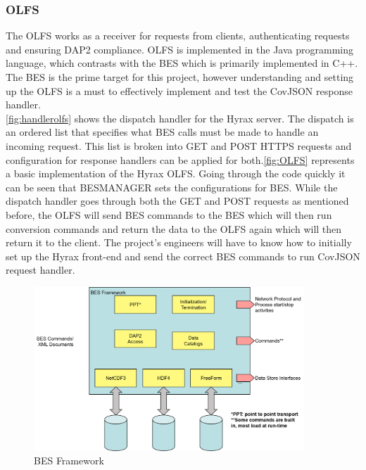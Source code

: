 \documentclass[onecolumn, draftclsnofoot,10pt, compsoc]{IEEEtran}
\begin{document}
\subsubsection{OLFS}
The OLFS works as a receiver for requests from clients, authenticating requests and ensuring DAP2 compliance. OLFS is implemented in the Java programming language, which contrasts with the BES which is primarily implemented in C++. The BES is the prime target for this project, however understanding and setting up the OLFS is a must to effectively implement and test the CovJSON response handler. \\
\autoref{fig:handlerolfs} shows the dispatch handler for the Hyrax server. The dispatch is an ordered list that specifies what BES calls must be made to handle an incoming request. This list is broken into \gls{GET} and \gls{POST} HTTPS requests and configuration for response handlers can be applied for both.\autoref{fig:OLFS} represents a basic implementation of the Hyrax OLFS.
Going through the code quickly it can be seen that BESMANAGER sets the configurations for BES. While the dispatch handler goes through both the GET and POST requests as mentioned before, the OLFS will send BES commands to the BES which will then run conversion commands and return the data to the OLFS again which will then return it to the client. The project's engineers will have to know how to initially set up the Hyrax front-end and send the correct BES commands to run CovJSON request handler. \cite{OLFS}
\begin{figure}[H]
    \centering
    \includegraphics[width=4in,scale=1.0]{BES.png}
    \caption{BES Framework}
    \label{fig:BES}
\end{figure}
\end{document}
